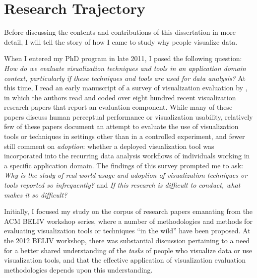 
\section{Research Trajectory}
\label{intro:research-trajectory}


Before discussing the contents and contributions of this dissertation in more detail, I will tell the story of how I came to study why people visualize data. 

When I entered my PhD program in late 2011, I posed the following question: {\it How do we evaluate visualization techniques and tools in an application domain context, particularly if these techniques and tools are used for data analysis?}
At this time, I read an early manuscript of a survey of visualization evaluation by \citet{Lam2012}, in which the authors read and coded over eight hundred recent visualization research papers that report an evaluation component.
While many of these papers discuss human perceptual performance or visualization usability, relatively few of these papers document an attempt to evaluate the use of visualization tools or techniques in settings other than in a controlled experiment, and fewer still comment on {\it adoption}: whether a deployed visualization tool was incorporated into the recurring data analysis workflows of individuals working in a specific application domain.
The findings of this survey prompted me to ask: {\it Why is the study of real-world usage and adoption of visualization techniques or tools reported so infrequently?} and {\it If this research is difficult to conduct, what makes it so difficult?}

Initially, I focused my study on the corpus of research papers emanating from the ACM \ac{BELIV} workshop series, where a number of methodologies and methods for evaluating visualization tools or techniques ``in the wild'' have been proposed. 
At the 2012 \ac{BELIV} workshop, there was substantial discussion pertaining to a need for a better shared understanding of the {\it tasks} of people who visualize data or use visualization tools, and that the effective application of visualization evaluation methodologies depends upon this understanding.

